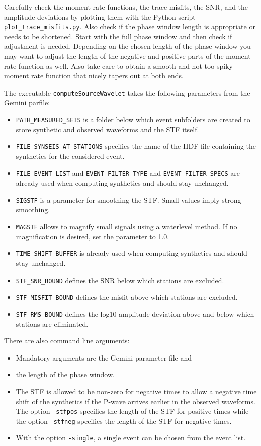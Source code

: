  Carefully check the moment rate functions, the trace misfits, the SNR, and the amplitude deviations by plotting them with the Python script \verb+plot_trace_misfits.py+. Also check if the phase window length is appropriate or needs to be shortened. Start with the full phase window and then check if adjustment is needed. Depending on the chosen length of the phase window you may want to adjust the length of the negative and positive parts of the moment rate function as well. Also take care to obtain a smooth and not too spiky moment rate function that nicely tapers out at both ends.

The executable \verb+computeSourceWavelet+ takes the following parameters from the Gemini parfile:
\begin{itemize}
	\setlength{\itemsep}{-0.1cm}
	\item
	\verb+PATH_MEASURED_SEIS+ is a folder below which event subfolders are created to store synthetic and observed waveforms and the STF itself.
	\item
    \verb+FILE_SYNSEIS_AT_STATIONS+ specifies the name of the HDF file containing the synthetics for the considered event.
    \item
    \verb+FILE_EVENT_LIST+ and \verb+EVENT_FILTER_TYPE+ and \verb+EVENT_FILTER_SPECS+ are already used when computing synthetics and should stay unchanged.
    \item
    \verb+SIGSTF+ is a parameter for smoothing the STF. Small values imply strong smoothing.
    \item
    \verb+MAGSTF+ allows to magnify small signals using a waterlevel method. If no magnification is desired, set the parameter to 1.0.
    \item
    \verb+TIME_SHIFT_BUFFER+ is already used when computing synthetics and should stay unchanged.
    \item
    \verb+STF_SNR_BOUND+ defines the SNR below which stations are excluded.
    \item \verb+STF_MISFIT_BOUND+ defines the misfit above which stations are excluded.
    \item \verb+STF_RMS_BOUND+ defines the log10 amplitude deviation above and below which stations are eliminated.
\end{itemize}
There are also command line arguments:
\begin{itemize}
	\setlength{\itemsep}{-0.1cm}
    \item Mandatory arguments are the Gemini parameter file and
    \item the length of the phase window.
    \item The STF is allowed to be non-zero for negative times to allow a negative time shift of the synthetics if the P-wave arrives earlier in the observed waveforms. The option
    \verb+-stfpos+ specifies the length of the STF for positive times while the option \verb+-stfneg+ specifies the length of the STF for negative times.
    \item With the option \verb+-single+, a single event can be chosen from the event list.
\end{itemize}
